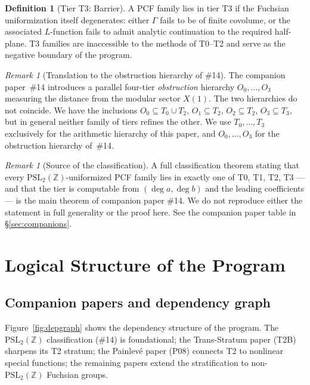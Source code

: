 \documentclass[11pt,a4paper]{article}
\theoremstyle{definition}
\newtheorem{definition}[conjecture]{Definition}
\theoremstyle{remark}
\newtheorem{remark}[conjecture]{Remark}
\newcommand{\PSLZ}{\mathrm{PSL}_2(\mathbb{Z})}
\begin{document}
\begin{definition}[Tier T3: Barrier]
A PCF family lies in tier T3 if the Fuchsian uniformization itself
degenerates: either $\Gamma$ fails to be of finite covolume, or the
associated $L$-function fails to admit analytic continuation to the
required half-plane. T3 families are inaccessible to the methods of T0--T2
and serve as the negative boundary of the program.
\end{definition}

\begin{remark}[Translation to the obstruction hierarchy of \#14]
\label{rem:tier-translation}
The companion paper~\#14 introduces a parallel four-tier
\emph{obstruction} hierarchy $O_0,\dots,O_3$ measuring the
distance from the modular sector $X(1)$. The two
hierarchies do not coincide. We have the inclusions
$O_0 \subseteq T_0 \cup T_2$, $O_1 \subseteq T_2$,
$O_2 \subseteq T_2$, $O_3 \subseteq T_3$, but in general
neither family of tiers refines the other. We use $T_0,\dots,T_3$
exclusively for the arithmetic hierarchy of this paper, and
$O_0,\dots,O_3$ for the obstruction hierarchy of~\#14.
\end{remark}

\begin{remark}[Source of the classification]
\label{rem:tiers-source}
A full classification theorem stating that every $\PSLZ$-uniformized
PCF family lies in exactly one of T0, T1, T2, T3 --- and that the
tier is computable from $(\deg a, \deg b)$ and the leading coefficients
--- is the main theorem of companion paper \#14. We do not reproduce
either the statement in full generality or the proof here. See the
companion paper table in \S\ref{sec:companions}.
\end{remark}

\section{Logical Structure of the Program}
\label{sec:structure}

\subsection{Companion papers and dependency graph}

Figure~\ref{fig:depgraph} shows the dependency structure of the
program. The $\PSLZ$ classification (\#14) is foundational; the
Trans-Stratum paper (T2B) sharpens its T2 stratum; the Painlevé
paper (P08) connects T2 to nonlinear special functions; the
remaining papers extend the stratification to non-$\PSLZ$
Fuchsian groups.
\end{document}
